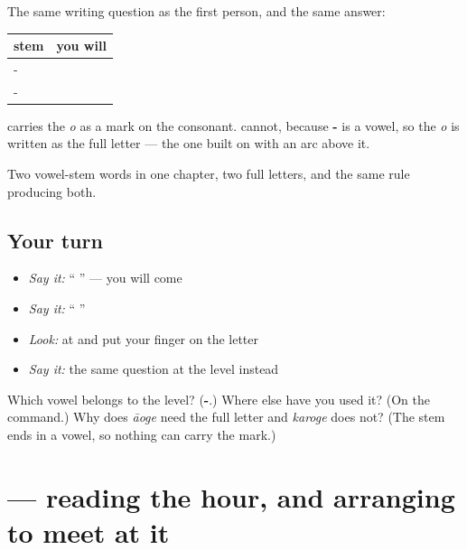 \begin{grammarlens}[title={Grammar Lens: where the full letter shows up again}]
The same writing question as the first person, and the same answer:

\noindent
\begin{tabularx}{\linewidth}{@{}>{\raggedright\arraybackslash}X>{\raggedright\arraybackslash}X@{}}
\toprule
\textbf{stem} & \textbf{you will} \\
\midrule
\hi{कर}- & \hi{करोगे} \\
\hi{आ}- & \hi{आओगे} \\
\bottomrule
\end{tabularx}

\textbf{} carries the \emph{o} as a mark on the consonant. \textbf{} cannot, because \textbf{-} is a vowel, so the \emph{o} is written as the full letter \textbf{} — the one built on \textbf{} with an arc above it.

Two vowel-stem words in one chapter, two full letters, and the same rule producing both.
\end{grammarlens}

\subsection*{Your turn}
\begin{itemize}
\raggedright
  \item \emph{Say it:} \textquotedblleft{} \textquotedblright{} — you will come
  \item \emph{Say it:} \textquotedblleft{} \textquotedblright{}
  \item \emph{Look:} at  and put your finger on the letter \textbf{}
  \item \emph{Say it:} the same question at the  level instead
\end{itemize}

\begin{tcolorbox}[breakable,colback=teal!4,colframe=teal!35!black,title={Before you move on}]
Which vowel belongs to the \textbf{} level? (\textbf{-}.) Where else have you used it? (On the command.) Why does \emph{āoge} need the full letter and \emph{karoge} does not? (The stem ends in a vowel, so nothing can carry the mark.)
\end{tcolorbox}
\section[\texorpdfstring{\hi{पाँच} \hi{बजे} (pā̃c baje)}{पाँच बजे (pā̃c baje)}]{  — reading the hour, and arranging to meet at it}

